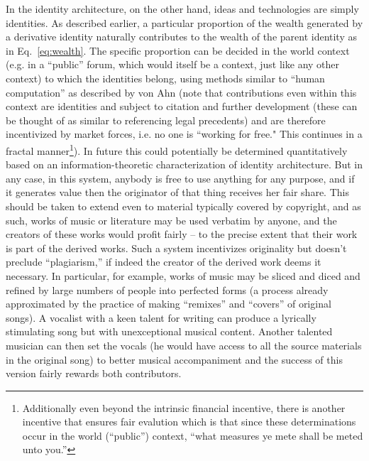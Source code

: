 \documentclass[pra,twocolumn,groupedaddress,10pt]{revtex4}
\theoremstyle{definition}
\begin{document}
In the identity architecture, on the other hand, ideas and technologies are simply identities. As described earlier, a particular proportion of the wealth generated by a derivative identity naturally contributes to the wealth of the parent identity as in Eq.~\ref{eq:wealth}. The specific proportion can be decided in the world context (e.g. in a ``public'' forum, which would itself be a context, just like any other context) to which the identities belong, using methods similar to ``human computation'' as described by von Ahn\cite{vonahn} (note that contributions even within this context are identities and subject to citation and further development (these can be thought of as similar to referencing legal precedents) and are therefore incentivized by market forces, i.e. no one is ``working for free." This continues in a fractal manner\footnote{Additionally even beyond the intrinsic financial incentive, there is another incentive that ensures fair evalution which is that since these determinations occur in the world (``public'') context, ``what measures ye mete shall be meted unto you.''}). In future this could potentially be determined quantitatively based on an information-theoretic characterization of identity architecture. But in any case, in this system, anybody is free to use anything for any purpose, and if it generates value then the originator of that thing receives her fair share. This should be taken to extend even to material typically covered by copyright, and as such, works of music or literature may be used verbatim by anyone, and the creators of these works would profit fairly -- to the precise extent that their work is part of the derived works. Such a system incentivizes originality but doesn't preclude ``plagiarism,'' if indeed the creator of the derived work deems it necessary. In particular, for example, works of music may be sliced and diced and refined by large numbers of people into perfected forms (a process already approximated by the practice of making ``remixes'' and ``covers'' of original songs). A vocalist with a keen talent for writing can produce a lyrically stimulating song but with unexceptional musical content. Another talented musician can then set the vocals (he would have access to all the source materials in the original song) to better musical accompaniment and the success of this version fairly rewards both contributors.
\end{document}
